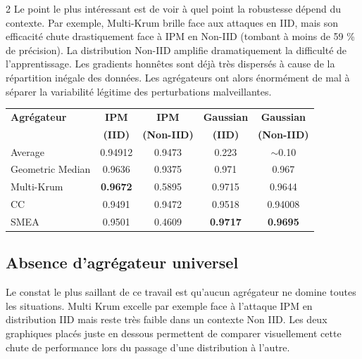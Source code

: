 \documentclass{article}
\begin{document}
\begin{multicols}{2}
Le point le plus int\'eressant est de voir \`a quel point la robustesse d\'epend du contexte. Par exemple, Multi-Krum brille face aux attaques en IID, mais son efficacit\'e chute drastiquement face \`a IPM en Non-IID (tombant \`a moins de 59 \% de pr\'ecision). La distribution Non-IID amplifie dramatiquement la difficult\'e de l'apprentissage. Les gradients honn\^etes sont d\'ej\`a tr\`es dispers\'es \`a cause de la r\'epartition in\'egale des donn\'ees. Les agr\'egateurs ont alors \'enorm\'ement de mal \`a s\'eparer la variabilit\'e l\'egitime des perturbations malveillantes.

\begin{center}
\label{tab:results}
\footnotesize
\setlength{\tabcolsep}{3pt} %
\begin{tabular}{lcccc}
\toprule
\textbf{Agr\'egateur} & \textbf{IPM} & \textbf{IPM} & \textbf{Gaussian} & \textbf{Gaussian} \\
 & \textbf{(IID)} & \textbf{(Non-IID)} & \textbf{(IID)} & \textbf{(Non-IID)} \\
\midrule
Average          & 0.94912       & 0.9473        & 0.223         & $\sim$0.10  \\
Geometric Median & 0.9636        & 0.9375        & 0.971         & 0.967     \\
Multi-Krum       & \textbf{0.9672} & 0.5895      & 0.9715        & 0.9644         \\
CC               & 0.9491        & 0.9472        & 0.9518        & 0.94008        \\
SMEA             & 0.9501        & 0.4609        & \textbf{0.9717} & \textbf{0.9695} \\
\bottomrule
\end{tabular}
\end{center}
\vspace{0.2cm}

\subsection{Absence d'agr\'egateur universel}

Le constat le plus saillant de ce travail est qu'aucun agr\'egateur ne domine toutes les situations. Multi Krum excelle par exemple face \`a l'attaque IPM en distribution IID mais reste tr\`es faible dans un contexte Non IID. Les deux graphiques plac\'es juste en dessous permettent de comparer visuellement cette chute de performance lors du passage d'une distribution \`a l'autre.


\end{multicols}
\end{document}
